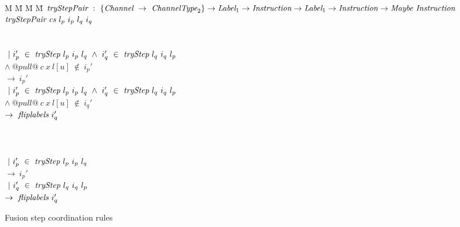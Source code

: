 \begin{figure}

\begin{tabbing}
M \= M \= M \= M \kill
$\textit{tryStepPair} ~:~ \{\textit{Channel} ~\to~ \textit{ChannelType}_2\} \to \textit{Label}_1 \to \textit{Instruction} \to \textit{Label}_1 \to \textit{Instruction} \to \textit{Maybe}~\textit{Instruction}$ \\
$\textit{tryStepPair} ~\textit{cs}~l_p~i_p~l_q~i_q$ \\
\\

\>  \\
\> $~|~i_p'~\in~\textit{tryStep}~l_p~i_p~l_q ~\wedge~ i_q'~\in~\textit{tryStep}~l_q~i_q~l_p$ \\
\> $\wedge~@pull@~c~x~l[u]~\not\in~i_p'$ \\
\> $\to~i_p'$ \\
\> $~|~i_p'~\in~\textit{tryStep}~l_p~i_p~l_q ~\wedge~i_q'~\in~\textit{tryStep}~l_q~i_q~l_p$ \\
\> $\wedge~@pull@~c~x~l[u]~\not\in~i_q'$ \\
\> $\to~\textit{fliplabels}~i_q'$ \\
\\

\>  \\
\>  \\
\> $~|~i_p'~\in~\textit{tryStep}~l_p~i_p~l_q$ \\
\> $\to~i_p'$ \\
\> $~|~i_q'~\in~\textit{tryStep}~l_q~i_q~l_p$ \\
\> $\to~\textit{fliplabels}~i_q'$ \\

\end{tabbing}

\caption{Fusion step coordination rules}
\label{fig:Fusion:Def:StepPair}
\end{figure}
